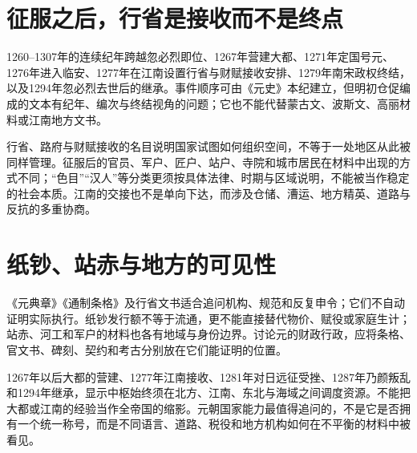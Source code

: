 \section{征服之后，行省是接收而不是终点}

1260--1307年的连续纪年跨越忽必烈即位、1267年营建大都、1271年定国号元、1276年进入临安、1277年在江南设置行省与财赋接收安排、1279年南宋政权终结，以及1294年忽必烈去世后的继承。事件顺序可由《元史》本纪建立，但明初仓促编成的文本有纪年、编次与终结视角的问题；它也不能代替蒙古文、波斯文、高丽材料或江南地方文书。

行省、路府与财赋接收的名目说明国家试图如何组织空间，不等于一处地区从此被同样管理。征服后的官员、军户、匠户、站户、寺院和城市居民在材料中出现的方式不同；“色目”“汉人”等分类更须按具体法律、时期与区域说明，不能被当作稳定的社会本质。江南的交接也不是单向下达，而涉及仓储、漕运、地方精英、道路与反抗的多重协商。

\section{纸钞、站赤与地方的可见性}

《元典章》《通制条格》及行省文书适合追问机构、规范和反复申令；它们不自动证明实际执行。纸钞发行额不等于流通，更不能直接替代物价、赋役或家庭生计；站赤、河工和军户的材料也各有地域与身份边界。讨论元的财政行政，应将条格、官文书、碑刻、契约和考古分别放在它们能证明的位置。

1267年以后大都的营建、1277年江南接收、1281年对日远征受挫、1287年乃颜叛乱和1294年继承，显示中枢始终须在北方、江南、东北与海域之间调度资源。不能把大都或江南的经验当作全帝国的缩影。元朝国家能力最值得追问的，不是它是否拥有一个统一称号，而是不同语言、道路、税役和地方机构如何在不平衡的材料中被看见。
